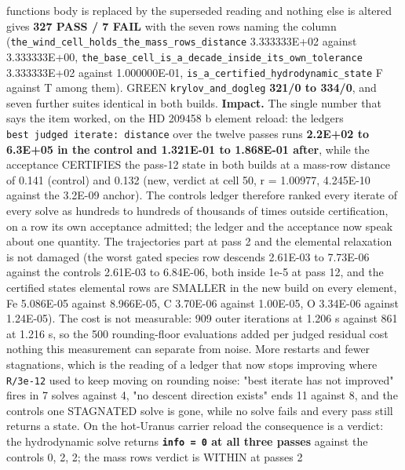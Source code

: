 \documentclass[english,a4paper]{my_memo}
\begin{document}
\begin{itemize}
  function\textquotesingle s body is replaced by the superseded reading and nothing else is
  altered gives \textbf{327 PASS / 7 FAIL} with the seven rows naming the column
  (\texttt{the\_wind\_cell\_holds\_the\_mass\_rows\_distance} 3.333333E+02 against
  3.333333E+00, \texttt{the\_base\_cell\_is\_a\_decade\_inside\_its\_own\_tolerance}
  3.333333E+02 against 1.000000E-01, \texttt{is\_a\_certified\_hydrodynamic\_state} F
  against T among them). GREEN \texttt{krylov\_and\_dogleg} \textbf{321/0 to 334/0}, and
  seven further suites identical in both builds. \textbf{Impact.} The single number
  that says the item worked, on the HD 209458 b element reload: the ledger\textquotesingle s
  \texttt{best\ judged\ iterate:\ distance} over the twelve passes runs \textbf{2.2E+02 to
  6.3E+05 in the control and 1.321E-01 to 1.868E-01 after}, while the
  acceptance CERTIFIES the pass-12 state in both builds at a mass-row distance of
  0.141 (control) and 0.132 (new, verdict at cell 50, r = 1.00977, 4.245E-10
  against the 3.2E-09 anchor). The control\textquotesingle s ledger therefore ranked every
  iterate of every solve as hundreds to hundreds of thousands of times outside
  certification, on a row its own acceptance admitted; the ledger and the
  acceptance now speak about one quantity. The trajectories part at pass 2 and
  the elemental relaxation is not damaged (the worst gated species row descends
  2.61E-03 to 7.73E-06 against the control\textquotesingle s 2.61E-03 to 6.84E-06, both inside
  1e-5 at pass 12, and the certified state\textquotesingle s elemental rows are SMALLER in the
  new build on every element, Fe 5.086E-05 against 8.966E-05, C 3.70E-06 against
  1.00E-05, O 3.34E-06 against 1.24E-05). The cost is not measurable: 909 outer
  iterations at 1.206 s against 861 at 1.216 s, so the 500 rounding-floor
  evaluations added per judged residual cost nothing this measurement can
  separate from noise. More restarts and fewer stagnations, which is the
  reading of a ledger that now stops improving where \texttt{\textbar{}\textbar{}R\textbar{}\textbar{}/3e-12} used to keep
  moving on rounding noise: "best iterate has not improved" fires in 7 solves
  against 4, "no descent direction exists" ends 11 against 8, and the control\textquotesingle s
  one STAGNATED solve is gone, while no solve fails and every pass still
  returns a state. On the hot-Uranus carrier reload the consequence is a
  verdict: the hydrodynamic solve returns \textbf{\texttt{info\ =\ 0} at all three passes}
  against the control\textquotesingle s 0, 2, 2; the mass row\textquotesingle s verdict is WITHIN at passes 2

\end{itemize}
\end{document}
